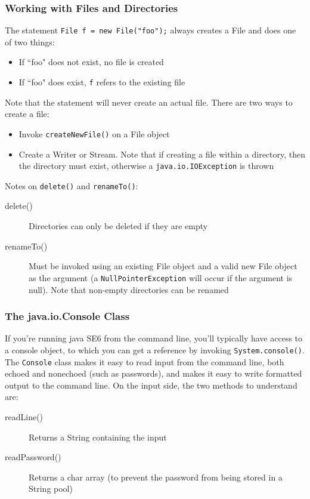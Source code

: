 \subsubsection{Working with Files and Directories}
The statement \verb#File f = new File("foo");# always creates a File and does 
one of two things:
\begin{itemize}
    \item If ``foo" does not exist, no file is created
    \item If ``foo" does exist, \verb#f# refers to the existing file
\end{itemize}
Note that the statement will never create an actual file. There are two ways to 
create a file:
\begin{itemize}
    \item Invoke \verb#createNewFile()# on a File object
    \item Create a Writer or Stream. Note that if creating a file within a 
    directory, then the directory must exist, otherwise a 
    \verb#java.io.IOException# is thrown
\end{itemize}
Notes on \verb#delete()# and \verb#renameTo()#:
\begin{description}
    \item[delete()] Directories can only be deleted if they are empty
    \item[renameTo()] Must be invoked using an existing File object and a valid 
    new File object as the argument (a \verb#NullPointerException# will occur 
    if the argument is null). Note that non-empty directories can be renamed
\end{description}

\subsubsection{The java.io.Console Class}
If you're running java SE6 from the command line, you'll typically have access 
to a console object, to which you can get a reference by invoking 
\verb#System.console()#. The \verb#Console# class makes it easy to read input 
from the command line, both echoed and nonechoed (such as passwords), and makes 
it easy to write formatted output to the command line. On the input side, the 
two methods to understand are:
\begin{description}
    \item[readLine()] Returns a String containing the input
    \item[readPassword()] Returns a char array (to prevent the password from 
    being stored in a String pool)
\end{description}


